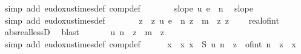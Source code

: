 \begin{isabellebody}
\ {\isacharparenleft}{\kern0pt}simp\ add{\isacharcolon}{\kern0pt}\ eudoxus{\isacharunderscore}{\kern0pt}times{\isacharunderscore}{\kern0pt}def\ comp{\isacharunderscore}{\kern0pt}def{\isacharparenright}{\kern0pt}\isanewline
\ \ \ \ \isamarkupfalse%
\ \isamarkupfalse%
\ {\isachardoublequoteopen}slope\ {\isacharparenleft}{\kern0pt}u\ {\isacharasterisk}{\kern0pt}\isactrlsub e\ {\isacharparenleft}{\kern0pt}{\isacharasterisk}{\kern0pt}{\isacharparenright}{\kern0pt}\ n{\isacharparenright}{\kern0pt}{\isachardoublequoteclose}\ \isamarkupfalse%
\ slope\ \isamarkupfalse%
\ {\isacharparenleft}{\kern0pt}simp\ add{\isacharcolon}{\kern0pt}\ eudoxus{\isacharunderscore}{\kern0pt}times{\isacharunderscore}{\kern0pt}def{\isacharparenright}{\kern0pt}\isanewline
\ \ \ \ \isamarkupfalse%
\ \isamarkupfalse%
\ z\ \ z{\isacharcolon}{\kern0pt}\ {\isachardoublequoteopen}{\isacharparenleft}{\kern0pt}u\ {\isacharasterisk}{\kern0pt}\isactrlsub e\ {\isacharparenleft}{\kern0pt}{\isacharasterisk}{\kern0pt}{\isacharparenright}{\kern0pt}\ n{\isacharparenright}{\kern0pt}\ z\ {\isachargreater}{\kern0pt}\ m\ {\isacharasterisk}{\kern0pt}\ z{\isachardoublequoteclose}\ {\isachardoublequoteopen}z\ {\isasymge}\ {}{\isachardoublequoteclose}\ \isamarkupfalse%
\ real{\isacharunderscore}{\kern0pt}of{\isacharunderscore}{\kern0pt}int\ \isamarkupfalse%
\ abs{\isacharunderscore}{\kern0pt}real{\isacharunderscore}{\kern0pt}lessD\ \isamarkupfalse%
\ blast\isanewline
\ \ \ \ \isamarkupfalse%
\ {\isacharasterisk}{\kern0pt}{\isacharasterisk}{\kern0pt}{\isacharcolon}{\kern0pt}\ {\isachardoublequoteopen}u\ {\isacharparenleft}{\kern0pt}n\ {\isacharasterisk}{\kern0pt}\ z{\isacharparenright}{\kern0pt}\ {\isachargreater}{\kern0pt}\ m\ {\isacharasterisk}{\kern0pt}\ z{\isachardoublequoteclose}\ \isamarkupfalse%
\ {\isacharparenleft}{\kern0pt}simp\ add{\isacharcolon}{\kern0pt}\ eudoxus{\isacharunderscore}{\kern0pt}times{\isacharunderscore}{\kern0pt}def\ comp{\isacharunderscore}{\kern0pt}def{\isacharparenright}{\kern0pt}\isanewline
\isanewline
\ \ \ \ \isamarkupfalse%
\ x\ \ x{\isacharcolon}{\kern0pt}\ {\isachardoublequoteopen}x\ {\isasymin}\ S{\isachardoublequoteclose}\ {\isachardoublequoteopen}u\ {\isacharparenleft}{\kern0pt}n\ {\isacharasterisk}{\kern0pt}\ z{\isacharparenright}{\kern0pt}\ {\isacharequal}{\kern0pt}\ {\isasymlfloor}of{\isacharunderscore}{\kern0pt}int\ {\isacharparenleft}{\kern0pt}n\ {\isacharasterisk}{\kern0pt}\ z{\isacharparenright}{\kern0pt}\ {\isacharasterisk}{\kern0pt}\ x{\isasymrfloor}{\isachardoublequoteclose}\ \isamarkupfalse%

\end{isabellebody}
